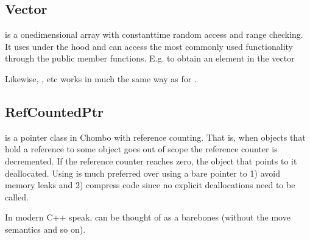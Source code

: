 \documentclass[letterpaper,10pt,english]{sphinxmanual}
\begin{document}
\subsection{Vector}
\label{\detokenize{Basics:vector}}
 is a one\sphinxhyphen{}dimensional array with constant\sphinxhyphen{}time random access and range checking.
It uses  under the hood and can access the most commonly used  functionality through the public member functions.
E.g. to obtain an element in the vector

\begin{sphinxVerbatim}[commandchars=\\\{\},formatcom=\scriptsize]
  

   \PYG{p}{[}\PYG{p}{]}
\end{sphinxVerbatim}

Likewise, ,  etc works in much the same way as for .


\subsection{RefCountedPtr}
\label{\detokenize{Basics:refcountedptr}}
 is a pointer class in Chombo with reference counting.
That is, when objects that hold a reference to some  object goes out of scope the reference counter is decremented.
If the reference counter reaches zero, the object that  points to it deallocated.
Using  is much preferred over using a bare pointer  to 1) avoid memory leaks and 2) compress code since no explicit deallocations need to be called.

In modern C++ speak,  can be thought of as a bare\sphinxhyphen{}bones  (without the move semantics and so on).
\end{document}
